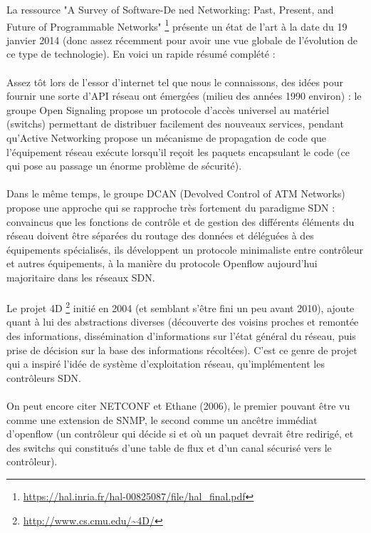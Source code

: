 La ressource "A Survey of Software-De ned Networking: Past, Present, and Future of Programmable Networks" \footnote{\label{histoire}\url{https://hal.inria.fr/hal-00825087/file/hal_final.pdf}} présente un état de l'art à la date du 19 janvier 2014 (donc assez récemment pour avoir une vue globale de l'évolution de ce type de technologie). En voici un rapide résumé complété :\\~\\

Assez tôt lors de l'essor d'internet tel que nous le connaissons, des idées pour fournir une sorte d'API réseau ont émergées (milieu des années 1990 environ) : le groupe Open Signaling propose un protocole d'accès universel au matériel (switchs) permettant de distribuer facilement des nouveaux services, pendant qu'Active Networking propose un mécanisme de propagation de code que l'équipement réseau exécute lorsqu'il reçoit les paquets encapsulant le code (ce qui pose au passage un énorme problème de sécurité).\\~\\

Dans le même temps, le groupe DCAN (Devolved Control of ATM Networks) propose une approche qui se rapproche très fortement du paradigme SDN : convaincus que les fonctions de contrôle et de gestion des différents éléments du réseau doivent être séparées du routage des données et déléguées à des équipements spécialisés, ils développent un protocole minimaliste entre contrôleur et autres équipements, à la manière du protocole Openflow aujourd'hui majoritaire dans les réseaux SDN.\\~\\

Le projet 4D \footnote{\url{http://www.cs.cmu.edu/~4D/}} initié en 2004 (et semblant s'être fini un peu avant 2010), ajoute quant à lui des abstractions diverses (découverte des voisins proches et remontée des informations, dissémination d'informations sur l'état général du réseau, puis prise de décision sur la base des informations récoltées). C'est ce genre de projet qui a inspiré l'idée de système d'exploitation réseau, qu'implémentent les contrôleurs SDN.\\~\\

On peut encore citer NETCONF et Ethane (2006), le premier pouvant être vu comme une extension de SNMP, le second comme un ancêtre immédiat d'openflow (un contrôleur qui décide si et où un paquet devrait être redirigé, et des switchs qui constitués d'une table de flux et d'un canal sécurisé vers le contrôleur).